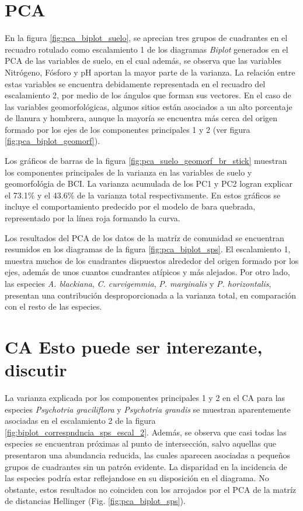 \documentclass[11pt,]{article}
\begin{document}
\section{PCA}\label{pca}

En la figura \ref{fig:pca_biplot_suelo}, se aprecian tres grupos de
cuadrantes en el recuadro rotulado como escalamiento 1 de los diagramas
\emph{Biplot} generados en el PCA de las variables de suelo, en el cual
además, se observa que las variables Nitrógeno, Fósforo y pH aportan la
mayor parte de la varianza. La relación entre estas variables se
encuentra debidamente representada en el recuadro del escalamiento 2,
por medio de los ángulos que forman sus vectores. En el caso de las
variables geomorfológicas, algunos sitios están asociados a un alto
porcentaje de llanura y hombrera, aunque la mayoría se encuentra más
cerca del origen formado por los ejes de los componentes principales 1 y
2 (ver figura \ref{fig:pca_biplot_geomorf}).

Los gráficos de barras de la figura \ref{fig:pca_suelo_geomorf_br_stick}
muestran los componentes principales de la varianza en las variables de
suelo y geomorfológia de BCI. La varianza acumulada de los PC1 y PC2
logran explicar el 73.1\% y el 43.6\% de la varianza total
respectivamente. En estos gráficos se incluye el comportamiento
predecido por el modelo de bara quebrada, representado por la línea roja
formando la curva.

Los resultados del PCA de los datos de la matríz de comunidad se
encuentran resumidos en los diagramas de la figura
\ref{fig:pca_biplot_sps}. El escalamiento 1, muestra muchos de los
cuadrantes dispuestos alrededor del origen formado por los ejes, además
de unos cuantos cuadrantes atípicos y más alejados. Por otro lado, las
especies \emph{A. blackiana}, \emph{C. curvigemmia}, \emph{P.
marginalis} y \emph{P. horizontalis}, presentan una contribución
desproporcionada a la varianza total, en comparación con el resto de las
especies.

\section{CA Esto puede ser interezante,
discutir}\label{ca-esto-puede-ser-interezante-discutir}

La varianza explicada por los componentes principales 1 y 2 en el CA
para las especies \emph{Psychotria graciliflora} y \emph{Psychotria
grandis} se muestran aparentemente asociadas en el escalamiento 2 de la
figura \ref{fig:biplot_correspndncia_sps_escal_2}. Además, se observa
que casi todas las especies se encuentran próximas al punto de
intersección, salvo aquellas que presentaron una abundancia reducida,
las cuales aparecen asociadas a pequeños grupos de cuadrantes sin un
patrón evidente. La disparidad en la incidencia de las especies podría
estar reflejandose en su disposición en el diagrama. No obstante, estos
resultados no coinciden con los arrojados por el PCA de la matríz de
distancias Hellinger (Fig. \ref{fig:pca_biplot_sps}).
\end{document}
